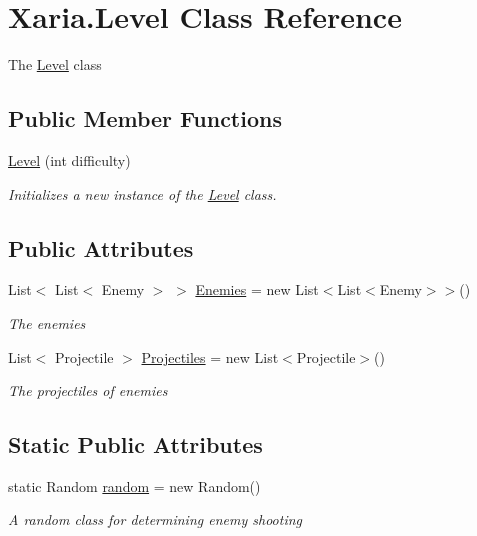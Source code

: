 \hypertarget{classXaria_1_1Level}{}\section{Xaria.\+Level Class Reference}
\label{classXaria_1_1Level}


The \hyperlink{classXaria_1_1Level}{Level} class  


\subsection*{Public Member Functions}
\begin{DoxyCompactItemize}
\item 
\hyperlink{classXaria_1_1Level_abbe8f5dc4eb2b1ea9bb259a4e1440838}{Level} (int difficulty)
\begin{DoxyCompactList}\small\item\em Initializes a new instance of the \hyperlink{classXaria_1_1Level}{Level} class. \end{DoxyCompactList}\end{DoxyCompactItemize}
\subsection*{Public Attributes}
\begin{DoxyCompactItemize}
\item 
List$<$ List$<$ Enemy $>$ $>$ \hyperlink{classXaria_1_1Level_a4eff7a4620cc9fc399d3eccd477f65ab}{Enemies} = new List$<$List$<$Enemy$>$$>$()
\begin{DoxyCompactList}\small\item\em The enemies \end{DoxyCompactList}\item 
List$<$ Projectile $>$ \hyperlink{classXaria_1_1Level_a104ab7863b71829e667c3e02dc128ecd}{Projectiles} = new List$<$Projectile$>$()
\begin{DoxyCompactList}\small\item\em The projectiles of enemies \end{DoxyCompactList}\end{DoxyCompactItemize}
\subsection*{Static Public Attributes}
\begin{DoxyCompactItemize}
\item 
static Random \hyperlink{classXaria_1_1Level_a9782c177ac48834cf40de7ab5a17469f}{random} = new Random()
\begin{DoxyCompactList}\small\item\em A random class for determining enemy shooting \end{DoxyCompactList}\end{DoxyCompactItemize}
